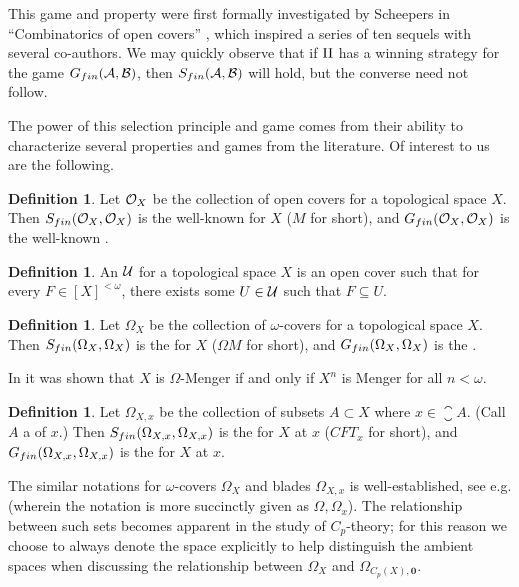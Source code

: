\documentclass{amsart}
\renewcommand{\vec}{\mathbf}
\theoremstyle{plain}
\theoremstyle{definition}
\newtheorem{definition}[theorem]{Definition}
\theoremstyle{remark}
\theoremstyle{plain}
\theoremstyle{definition}
\theoremstyle{remark}
\begin{document}
This game and property were first formally investigated
by Scheepers in ``Combinatorics of open covers'' \cite{MR1378387}, which
inspired a series of ten sequels with several co-authors. We may quickly
observe that if \(\mathrm{II}\) has a winning strategy for the game
\(G_{fin}(\mathcal{A},\mathcal{B})\), then \(S_{fin}(\mathcal{A},\mathcal{B})\) will hold,
but the converse need not follow.

The power of this selection principle and game comes from their ability
to characterize several properties and games from the literature.
Of interest to us are the following.

\begin{definition}
  Let \(\mathcal{O}_X\) be the collection of open covers for a topological space
  \(X\). Then \(S_{fin}(\mathcal{O}_X,\mathcal{O}_X)\) is the well-known
   for \(X\) (\(M\) for short), and
  \(G_{fin}(\mathcal{O}_X,\mathcal{O}_X)\) is the
  well-known .
\end{definition}

\begin{definition}
  An  \(\mathcal{U}\)
  for a topological space \(X\) is an open cover
  such that for every \(F\in[X]^{<\omega}\), there exists some \(U\in\mathcal{U}\)
  such that \(F\subseteq U\).
\end{definition}

\begin{definition}
  Let \(\Omega_X\) be the collection of \(\omega\)-covers for a topological
  space \(X\). Then \(S_{fin}(\Omega_X,\Omega_X)\) is the
   for \(X\) (\(\Omega M\) for short), and
  \(G_{fin}(\Omega_X,\Omega_X)\) is the .
\end{definition}

In \cite[Theorem 3.9]{MR1419798} it was shown that \(X\) is \(\Omega\)-Menger
if and only if \(X^n\) is Menger for all \(n<\omega\).

\begin{definition}
  Let \(\Omega_{X,x}\) be the collection of subsets \(A\subset X\) where
  \(x\in\closure{A}\). (Call \(A\) a  of \(x\).)
  Then \(S_{fin}(\Omega_{X,x},\Omega_{X,x})\) is the
   for \(X\) at \(x\)
  (\(CFT_x\) for short), and
  \(G_{fin}(\Omega_{X,x},\Omega_{X,x})\) is the
   for \(X\) at \(x\).
\end{definition}

The similar notations for \(\omega\)-covers \(\Omega_X\) and
blades \(\Omega_{X,x}\) is well-established, see e.g.
\cite[Topological games and Ramsey theory]{19362020070101} (wherein
the notation is more succinctly given as \(\Omega,\Omega_x\)).  The
relationship between such sets becomes apparent in the study of
\(C_p\)-theory; for this reason we choose to always denote the space
explicitly to help distinguish the ambient spaces when discussing
the relationship between \(\Omega_X\) and
\(\Omega_{C_p(X),\vec 0}\).
\end{document}

